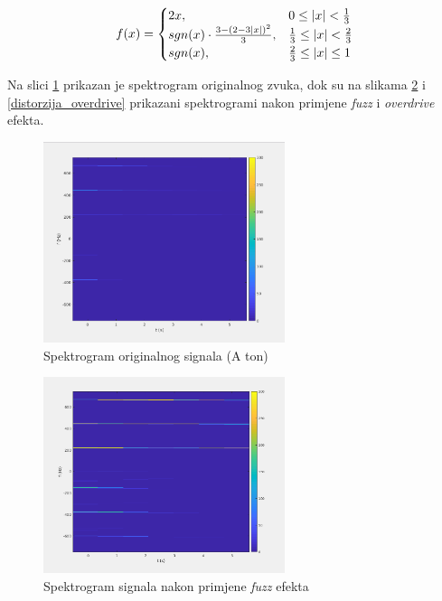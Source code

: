 \documentclass[conference]{IEEEtran}
\begin{document}
\begin{equation}
  f(x)=
    \begin{cases}
      2\*x, & 0 \leq |x|<\frac{1}{3} \\
      sgn(x)\cdot\frac{3-(2-3\*|x|)^2}{3}, & \frac{1}{3} \leq |x| < \frac{2}{3} \\
      sgn(x), & \frac{2}{3} \leq |x| \leq 1 \\
    \end{cases}
  \label{overdrive}
\end{equation}

Na slici \ref{A_original_spektar} prikazan je spektrogram originalnog zvuka, dok su na slikama 
\ref{distorzija_fuzz} i \ref{distorzija_overdrive} prikazani spektrogrami nakon primjene \textit{fuzz} i 
\textit{overdrive} efekta.

\begin{figure}[H]
    \includegraphics[width=200pt]{slike/A_ton.png}
    \centering
    \caption{Spektrogram originalnog signala (A ton)}
    \label{A_original_spektar}
\end{figure}

\begin{figure}[H]
    \includegraphics[width=200pt]{slike/distorzija_fuzz.png}
    \centering
    \caption{Spektrogram signala nakon primjene \textit{fuzz} efekta}
    \label{distorzija_fuzz}
\end{figure}
\end{document}
